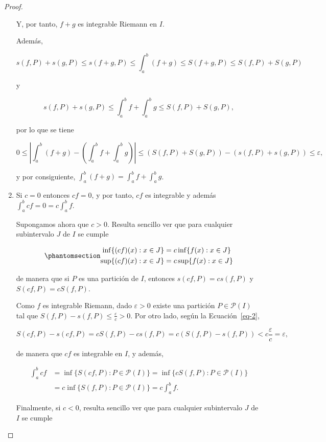 \documentclass[
  a4paper,
]{scrreport}
\theoremstyle{definition}
\theoremstyle{plain}
\theoremstyle{definition}
\theoremstyle{definition}
\theoremstyle{plain}
\theoremstyle{plain}
\theoremstyle{remark}
\begin{document}
\begin{tcolorbox}
\begin{proof}
\begin{enumerate}
  Y, por tanto, \(f+g\) es integrable Riemann en \(I\).

  Además,

  \[
  s(f,P) + s(g,P) \leq s(f+g,P) \leq \int_a^b (f+g) \leq  S(f+g,P) \leq S(f,P) + S(g,P)
  \]

  y

  \[
  s(f,P) + s(g,P) \leq  \int_a^b f + \int_a^b g \leq S(f,P) + S(g,P),
  \]

  por lo que se tiene

  \[
  0\leq \left|\int_a^b (f+g) - \left(\int_a^b f + \int_a^b g\right)\right| \leq (S(f,P)+S(g,P)) - (s(f,P)+s(g,P)) \leq \varepsilon,
  \]

  y por consiguiente, \(\int_a^b (f+g) = \int_a^b f + \int_a^b g\).
\item
  Si \(c=0\) entonces \(cf=0\), y por tanto, \(cf\) es integrable y
  además \(\int_a^b cf = 0 = c\int_a^b f\).

  Supongamos ahora que \(c>0\). Resulta sencillo ver que para cualquier
  subintervalo \(J\) de \(I\) se cumple

  \begin{equation}\phantomsection\label{eq-2}{
  \begin{gathered}
  \inf\{(cf)(x): x\in J\} = c\inf\{f(x): x\in J\}\\
  \sup\{(cf)(x): x\in J\} = c\sup\{f(x): x\in J\}
  \end{gathered}
  }\end{equation}

  de manera que si \(P\) es una partición de \(I\), entonces
  \(s(cf,P)= cs(f,P)\) y \(S(cf,P) = cS(f,P)\).

  Como \(f\) es integrable Riemann, dado \(\varepsilon>0\) existe una
  partición \(P\in\mathcal{P}(I)\) tal que
  \(S(f,P)-s(f,P)\leq \frac{\varepsilon}{c} >0\). Por otro lado, según
  la Ecuación~\ref{eq-2},

  \[
  S(cf,P) - s(cf,P) = c S(f,P) - cs(f,P) = c(S(f,P)-s(f,P)) < c\frac{\varepsilon}{c} = \varepsilon,
  \]

  de manera que \(cf\) es integrable en \(I\), y además,

  \begin{align*}
  \int_a^b cf &= \inf\{S(cf,P): P\in \mathcal{P}(I)\} = \inf\{cS(f,P): P\in \mathcal{P}(I)\} \\
  &= c\inf\{S(f,P): P\in \mathcal{P}(I)\} = c\int_a^b f.
  \end{align*}

  Finalmente, si \(c<0\), resulta sencillo ver que para cualquier
  subintervalo \(J\) de \(I\) se cumple


\end{enumerate}
\end{proof}
\end{tcolorbox}
\end{document}
